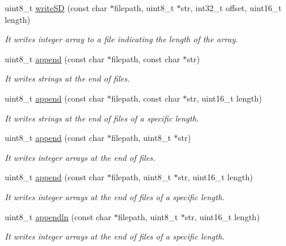 \begin{DoxyCompactItemize}
uint8\+\_\+t \hyperlink{class_wasp_s_d_a5c2e9b515f3e4539d7a0ae8f87354047}{write\+SD} (const char $\ast$filepath, uint8\+\_\+t $\ast$str, int32\+\_\+t offset, uint16\+\_\+t length)
\begin{DoxyCompactList}\small\item\em It writes integer array to a file indicating the length of the array. \end{DoxyCompactList}\item 
uint8\+\_\+t \hyperlink{class_wasp_s_d_a97e609bad6fc6d25171e47d02226b9d4}{append} (const char $\ast$filepath, const char $\ast$str)
\begin{DoxyCompactList}\small\item\em It writes strings at the end of files. \end{DoxyCompactList}\item 
uint8\+\_\+t \hyperlink{class_wasp_s_d_a4270dadbd688fba912069dc39934f70e}{append} (const char $\ast$filepath, const char $\ast$str, uint16\+\_\+t length)
\begin{DoxyCompactList}\small\item\em It writes strings at the end of files of a specific length. \end{DoxyCompactList}\item 
uint8\+\_\+t \hyperlink{class_wasp_s_d_a4a187b5a5e2635bee084d96c8c415de3}{append} (const char $\ast$filepath, uint8\+\_\+t $\ast$str)
\begin{DoxyCompactList}\small\item\em It writes integer arrays at the end of files. \end{DoxyCompactList}\item 
uint8\+\_\+t \hyperlink{class_wasp_s_d_a39d2fab7cf0f4ddd7c25bb005823f4cb}{append} (const char $\ast$filepath, uint8\+\_\+t $\ast$str, uint16\+\_\+t length)
\begin{DoxyCompactList}\small\item\em It writes integer arrays at the end of files of a specific length. \end{DoxyCompactList}\item 
uint8\+\_\+t \hyperlink{class_wasp_s_d_a0f62caa7efd499f04bae51bc94096739}{appendln} (const char $\ast$filepath, uint8\+\_\+t $\ast$str, uint16\+\_\+t length)
\begin{DoxyCompactList}\small\item\em It writes integer arrays at the end of files of a specific length. \end{DoxyCompactList}\item 

\end{DoxyCompactItemize}
